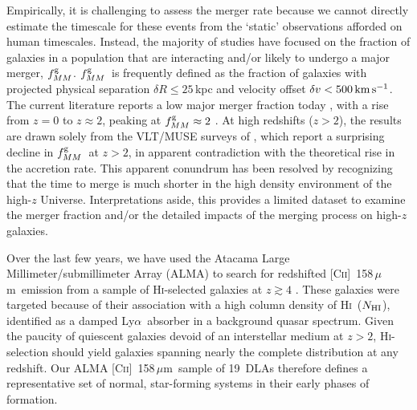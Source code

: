 \documentclass[twocolumn]{aastex62}
\newcommand{\cplus}{[\ctwo]~158\,$\mu$m}
\newcommand{\mnhi}{N_{\rm HI}}
\newcommand{\nhi}{$\mnhi$}
\newcommand{\mfmg}{f_{MM}^{\rm g}}    %
\newcommand{\fmg}{$\mfmg$}
\newcommand{\mkms}{\rm km \, s^{-1}}
\newcommand{\mmsun}{M_{\odot}}
\newcommand{\hi}{H\textsc{i}}
\newcommand{\ctwo}{C\textsc{ii}}
\newcommand{\lya}{Ly$\alpha$}
\begin{document}
Empirically, it is challenging to assess the merger rate because we cannot 
directly estimate the timescale for these events from the `static' observations 
afforded on human timescales.  Instead, the majority of studies have focused on 
the fraction of galaxies in a population that are interacting and/or likely to 
undergo a major merger, \fmg.  \fmg\ is frequently defined as the fraction 
of galaxies with projected physical separation $\delta R \le 25$\,kpc and velocity 
offset $\delta v < 500 \, \mkms$. The current literature reports a low major merger 
fraction today \citep[$\mfmg \approx 0.01$][]{xu+2012}, with a rise from $z=0$ to 
$z\approx 2$, peaking at $\mfmg \approx 2$ \citep{lopez+2013,ventou+2017,ventou+2019}.  
At high redshifts ($z> 2$), the results are drawn solely from the VLT/MUSE surveys of 
\cite{ventou+2017,ventou+2019}, which report a surprising decline in \fmg\ at $z > 2$, 
in apparent contradiction with the theoretical rise in the accretion rate. This apparent 
conundrum has been resolved by recognizing that the time to merge is much shorter in the 
high density environment of the high-$z$ Universe.%
Interpretations aside, 
this provides a limited dataset to examine the merger fraction and/or the detailed 
impacts of the merging process on high-$z$ galaxies.


Over the last few years, we have used the Atacama Large Millimeter/submillimeter Array (ALMA) to search for redshifted \cplus\ emission from a sample of \hi-selected galaxies at $z \gtrsim 4$ \citep{neeleman+17,neeleman+19}. These galaxies were targeted because of their association with a high column density of \hi\ (\nhi), identified as a damped  \lya\ absorber \citep[DLA;][]{wgp05} in a background quasar spectrum. 
Given the paucity of quiescent galaxies devoid of an interstellar medium at $z>2$,  
\hi-selection should yield galaxies spanning nearly the complete distribution at any redshift. 
Our ALMA \cplus\ sample of 19~DLAs therefore defines a representative set of normal, 
star-forming systems in their early phases of formation.
\end{document}
